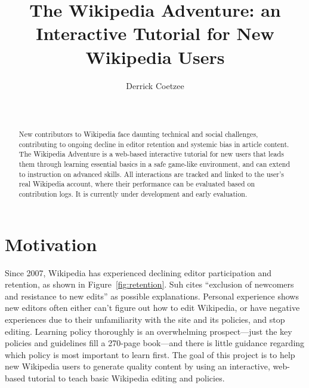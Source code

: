 \documentclass{acm_proc_article-sp}
\begin{document}
\title{The Wikipedia Adventure: an Interactive Tutorial for New Wikipedia Users}

\author{
\alignauthor
Derrick Coetzee \\
       \\
       \\
}

\maketitle

\begin{abstract}
New contributors to Wikipedia face daunting technical and social challenges, contributing to ongoing decline in editor retention and systemic bias in article content. The Wikipedia Adventure is a web-based interactive tutorial for new users that leads them through learning essential basics in a safe game-like environment, and can extend to instruction on advanced skills. All interactions are tracked and linked to the user's real Wikipedia account, where their performance can be evaluated based on contribution logs. It is currently under development and early evaluation.
\end{abstract}


\section{Motivation}

Since 2007, Wikipedia has experienced declining editor participation and retention, as shown in Figure~\ref{fig:retention}. Suh\cite{Suh:2009} cites ``exclusion of newcomers and resistance to new edits'' as possible explanations. Personal experience shows new editors often either can't figure out how to edit Wikipedia, or have negative experiences due to their unfamiliarity with the site and its policies, and stop editing. Learning policy thoroughly is an overwhelming prospect---just the key policies and guidelines fill a 270-page book---and there is little guidance regarding which policy is most important to learn first. The goal of this project is to help new Wikipedia users to generate quality content by using an interactive, web-based tutorial to teach basic Wikipedia editing and policies.
\end{document}
